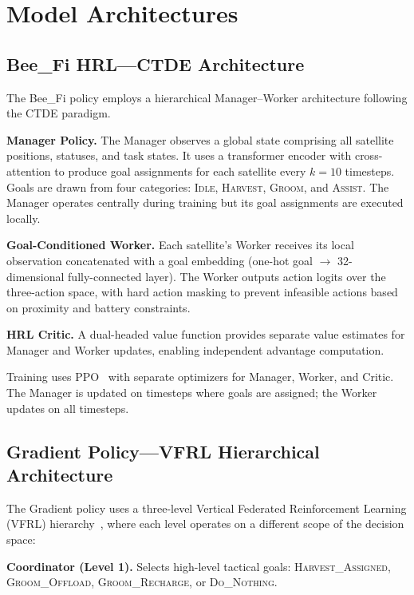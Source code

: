 \documentclass[conference]{IEEEtran}
\begin{document}
\section{Model Architectures}
\label{sec:models}

\subsection{Bee\_Fi HRL---CTDE Architecture}

The Bee\_Fi policy employs a hierarchical Manager--Worker architecture following the CTDE paradigm.

\textbf{Manager Policy.} The Manager observes a global state comprising all satellite positions, statuses, and task states. It uses a transformer encoder with cross-attention to produce goal assignments for each satellite every $k = 10$ timesteps. Goals are drawn from four categories: \textsc{Idle}, \textsc{Harvest}, \textsc{Groom}, and \textsc{Assist}. The Manager operates centrally during training but its goal assignments are executed locally.

\textbf{Goal-Conditioned Worker.} Each satellite's Worker receives its local observation concatenated with a goal embedding (one-hot goal $\rightarrow$ 32-dimensional fully-connected layer). The Worker outputs action logits over the three-action space, with hard action masking to prevent infeasible actions based on proximity and battery constraints.

\textbf{HRL Critic.} A dual-headed value function provides separate value estimates for Manager and Worker updates, enabling independent advantage computation.

Training uses PPO~\cite{schulman2017proximal} with separate optimizers for Manager, Worker, and Critic. The Manager is updated on timesteps where goals are assigned; the Worker updates on all timesteps.

\subsection{Gradient Policy---VFRL Hierarchical Architecture}

The Gradient policy uses a three-level Vertical Federated Reinforcement Learning (VFRL) hierarchy~\cite{vezhnevets2017feudal}, where each level operates on a different scope of the decision space:

\textbf{Coordinator (Level 1).} Selects high-level tactical goals: \textsc{Harvest\_Assigned}, \textsc{Groom\_Offload}, \textsc{Groom\_Recharge}, or \textsc{Do\_Nothing}.
\end{document}
